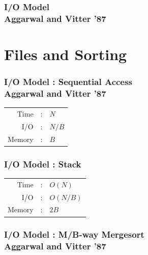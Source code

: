 \documentclass[english, aspectratio=169]{beamer}
\begin{document}
\begin{frame}
  
\end{frame}

\begin{frame}
  \frametitle{I/O Model\\Aggarwal and Vitter '87}

  \begin{figure}
    \centering
    
  \end{figure}
\end{frame}

\section{Files and Sorting}

\begin{frame}
  \frametitle{I/O Model : Sequential Access\\Aggarwal and Vitter '87}

  

   {
    \begin{table}
      \begin{tabular}{rcl}
        Time   & : & $N$
        \\
        I/O    & : & $N/B$
        \\
        Memory & : & $B$
      \end{tabular}
    \end{table}
  }
\end{frame}

\begin{frame}
  \frametitle{I/O Model : Stack\\\phantom{Aggarwal and Vitter '87}}

  

   {
    \begin{table}
      \begin{tabular}{rcl}
        Time   & : & $O(N)$
        \\
        I/O    & : & $O(N/B)$
        \\
        Memory & : & $2B$
      \end{tabular}
    \end{table}
  }
\end{frame}

\begin{frame}
  \frametitle{I/O Model : M/B-way Mergesort\\Aggarwal and Vitter '87}

  
\end{frame}
\end{document}

